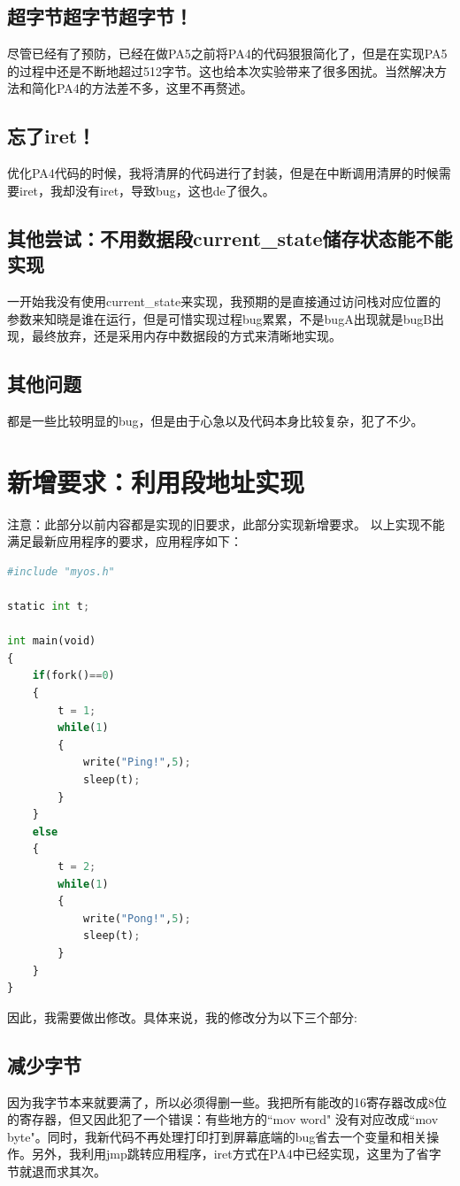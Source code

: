 \documentclass{LabReport}
\begin{document}
	\subsection{ 超字节超字节超字节！}
	尽管已经有了预防，已经在做PA5之前将PA4的代码狠狠简化了，但是在实现PA5的过程中还是不断地超过512字节。这也给本次实验带来了很多困扰。当然解决方法和简化PA4的方法差不多，这里不再赘述。
	
	\subsection{ 忘了iret！}
	优化PA4代码的时候，我将清屏的代码进行了封装，但是在中断调用清屏的时候需要iret，我却没有iret，导致bug，这也de了很久。
	
	\subsection{ 其他尝试：不用数据段current\_state储存状态能不能实现}
	一开始我没有使用current\_state来实现，我预期的是直接通过访问栈对应位置的参数来知晓是谁在运行，但是可惜实现过程bug累累，不是bugA出现就是bugB出现，最终放弃，还是采用内存中数据段的方式来清晰地实现。

	\subsection{ 其他问题}
	都是一些比较明显的bug，但是由于心急以及代码本身比较复杂，犯了不少。
	
	\section{新增要求：利用段地址实现}
	{\color{red} 注意：此部分以前内容都是实现的旧要求，此部分实现新增要求。}
	以上实现不能满足最新应用程序的要求，应用程序如下：
		\begin{lstlisting}[language=python,frame=shadowbox]
#include "myos.h"

static int t;

int main(void)
{   
	if(fork()==0)
	{
		t = 1;
		while(1)
		{
			write("Ping!",5);
			sleep(t);
		}
	}
	else
	{
		t = 2;
		while(1)
		{
			write("Pong!",5);
			sleep(t);
		}
	}
}
	\end{lstlisting}
	
	因此，我需要做出修改。具体来说，我的修改分为以下三个部分:
	\subsection{ 减少字节}
	因为我字节本来就要满了，所以必须得删一些。我把所有能改的16寄存器改成8位的寄存器，但又因此犯了一个错误：有些地方的``mov word" 没有对应改成``mov byte"。同时，我新代码不再处理打印打到屏幕底端的bug省去一个变量和相关操作。另外，我利用jmp跳转应用程序，iret方式在PA4中已经实现，这里为了省字节就退而求其次。
	
\end{document}
